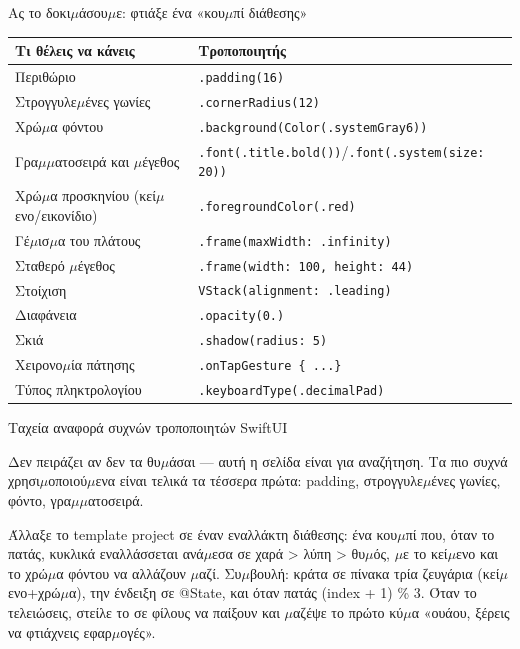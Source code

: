 \begin{tcbpractice}{Ας το δοκι$\mu$άσου$\mu$ε: φτιάξε ένα «κου$\mu$πί διάθεσης»}

\begin{center}
\begin{tabularx}{\linewidth}{|X|X|}
\hline
\textbf{Τι θέλεις να κάνεις} & \textbf{Τροποποιητής} \tabularnewline
\hline
Περιθώριο & \texttt{.\allowbreak padding(16)} \tabularnewline
Στρογγυλε$\mu$ένες γωνίες & \texttt{.\allowbreak cornerRadius(12)} \tabularnewline
Χρώ$\mu$α φόντου & \texttt{.\allowbreak background(Color(.\allowbreak systemGray6))} \tabularnewline
Γρα$\mu$$\mu$ατοσειρά και $\mu$έγεθος & \texttt{.\allowbreak font(.\allowbreak title.\allowbreak bold())}/\texttt{.\allowbreak font(.\allowbreak system(size: 20))} \tabularnewline
Χρώ$\mu$α προσκηνίου (κεί$\mu$ενο/εικονίδιο) & \texttt{.\allowbreak foregroundColor(.\allowbreak red)} \tabularnewline
Γέ$\mu$ισ$\mu$α του πλάτους & \texttt{.\allowbreak frame(maxWidth: .\allowbreak infinity)} \tabularnewline
Σταθερό $\mu$έγεθος & \texttt{.\allowbreak frame(width: 100, height: 44)} \tabularnewline
Στοίχιση & \texttt{VStack(alignment: .\allowbreak leading)} \tabularnewline
Διαφάνεια & \texttt{.\allowbreak opacity(0.\allowbreak 6)} \tabularnewline
Σκιά & \texttt{.\allowbreak shadow(radius: 5)} \tabularnewline
Χειρονο$\mu$ία πάτησης & \texttt{.\allowbreak onTapGesture \{ .\allowbreak .\allowbreak .\allowbreak  \}} \tabularnewline
Τύπος πληκτρολογίου & \texttt{.\allowbreak keyboardType(.\allowbreak decimalPad)} \tabularnewline
\hline
\end{tabularx}
\end{center}

\begin{center}\small\color{gray}Ταχεία αναφορά συχνών τροποποιητών SwiftUI\end{center}

Δεν πειράζει αν δεν τα θυ$\mu$άσαι — αυτή η σελίδα είναι για αναζήτηση. Τα πιο συχνά χρησι$\mu$οποιού$\mu$ενα είναι τελικά τα τέσσερα πρώτα: padding, στρογγυλε$\mu$ένες γωνίες, φόντο, γρα$\mu$$\mu$ατοσειρά.

Άλλαξε το template project σε έναν εναλλάκτη διάθεσης: ένα κου$\mu$πί που, όταν το πατάς, κυκλικά εναλλάσσεται ανά$\mu$εσα σε χαρά > λύπη > θυ$\mu$ός, $\mu$ε το κεί$\mu$ενο και το χρώ$\mu$α φόντου να αλλάζουν $\mu$αζί. Συ$\mu$βουλή: κράτα σε πίνακα τρία ζευγάρια (κεί$\mu$ενο+χρώ$\mu$α), την ένδειξη σε @State, και όταν πατάς (index + 1) \% 3. Όταν το τελειώσεις, στείλε το σε φίλους να παίξουν και $\mu$αζέψε το πρώτο κύ$\mu$α «ουάου, ξέρεις να φτιάχνεις εφαρ$\mu$ογές».

\end{tcbpractice}

